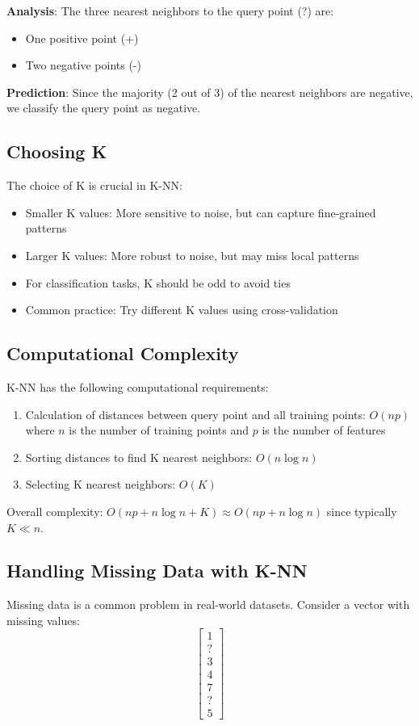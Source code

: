 \documentclass[12pt]{article}
\begin{document}
\textbf{Analysis}: The three nearest neighbors to the query point (?) are:
\begin{itemize}
    \item One positive point (+)
    \item Two negative points (-)
\end{itemize}

\textbf{Prediction}: Since the majority (2 out of 3) of the nearest neighbors are negative, we classify the query point as negative.

\subsection{Choosing K}
The choice of K is crucial in K-NN:
\begin{itemize}
    \item Smaller K values: More sensitive to noise, but can capture fine-grained patterns
    \item Larger K values: More robust to noise, but may miss local patterns
    \item For classification tasks, K should be odd to avoid ties
    \item Common practice: Try different K values using cross-validation
\end{itemize}

\subsection{Computational Complexity}
K-NN has the following computational requirements:
\begin{enumerate}
    \item Calculation of distances between query point and all training points: $O(np)$ where $n$ is the number of training points and $p$ is the number of features
    \item Sorting distances to find K nearest neighbors: $O(n \log n)$
    \item Selecting K nearest neighbors: $O(K)$
\end{enumerate}

Overall complexity: $O(np + n \log n + K) \approx O(np + n \log n)$ since typically $K \ll n$.

\subsection{Handling Missing Data with K-NN}
Missing data is a common problem in real-world datasets. Consider a vector with missing values:
\[
    \begin{bmatrix}
        1 \\
        ? \\
        3 \\
        4 \\
        7 \\
        ? \\
        5
    \end{bmatrix}
\] 
\end{document}
